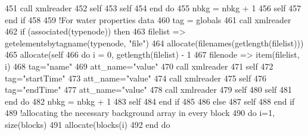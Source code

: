 \begin{DoxyCode}
451                 \textcolor{keyword}{call }xmlreader%
452                 self%
453                 self%
454 \textcolor{keywordflow}{            end do}
455             nbkg = nbkg + 1
456             self%
457 \textcolor{keywordflow}{        end if}
458         
459         \textcolor{comment}{!For water properties data}
460         tag = globals%
461         \textcolor{keyword}{call }xmlreader%
462         \textcolor{keywordflow}{if} (\textcolor{keyword}{associated}(typenode)) \textcolor{keywordflow}{then}
463             filelist => getelementsbytagname(typenode, \textcolor{stringliteral}{"file"})
464             \textcolor{keyword}{allocate}(filenames(getlength(filelist)))
465             \textcolor{keyword}{allocate}(self%
466             \textcolor{keywordflow}{do} i = 0, getlength(filelist) - 1
467                 filenode => item(filelist, i)
468                 tag=\textcolor{stringliteral}{"name"}
469                 att\_name=\textcolor{stringliteral}{"value"}
470                 \textcolor{keyword}{call }xmlreader%
471                 self%
472                 tag=\textcolor{stringliteral}{"startTime"}
473                 att\_name=\textcolor{stringliteral}{"value"}
474                 \textcolor{keyword}{call }xmlreader%
475                 self%
476                 tag=\textcolor{stringliteral}{"endTime"}
477                 att\_name=\textcolor{stringliteral}{"value"}
478                 \textcolor{keyword}{call }xmlreader%
479                 self%
480                 self%
481 \textcolor{keywordflow}{            end do}
482             nbkg = nbkg + 1
483             self%
484 \textcolor{keywordflow}{        end if}
485         
486     \textcolor{keywordflow}{else}
487         self%
488 \textcolor{keywordflow}{    end if}
489     \textcolor{comment}{!allocating the necessary background array in every block}
490     \textcolor{keywordflow}{do} i=1, \textcolor{keyword}{size}(blocks)
491         \textcolor{keyword}{allocate}(blocks(i)%
492 \textcolor{keywordflow}{    end do}
\end{DoxyCode}
\mbox{\label{namespacesimulationinputstreamer__mod_a3d4540f8e04cc0215895cad65c5be952}} 
